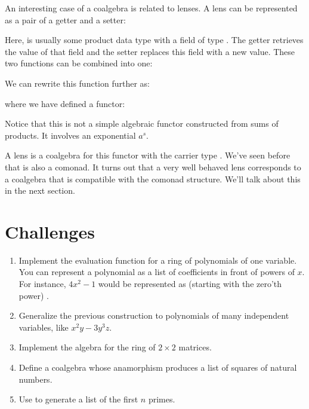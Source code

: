 An interesting case of a coalgebra is related to lenses. A lens can be
represented as a pair of a getter and a setter:

Here,  is usually some product data type with a field of type
. The getter retrieves the value of that field and the setter
replaces this field with a new value. These two functions can be
combined into one:

We can rewrite this function further as:

where we have defined a functor:

Notice that this is not a simple algebraic functor constructed from sums
of products. It involves an exponential $a^s$.

A lens is a coalgebra for this functor with the carrier type .
We've seen before that  is also a comonad. It turns out
that a very well behaved lens corresponds to a coalgebra that is compatible
with the comonad structure. We'll talk about this in the next section.

\section{Challenges}

\begin{enumerate}
	\tightlist
	\item
	      Implement the evaluation function for a ring of polynomials of one
	      variable. You can represent a polynomial as a list of coefficients in
	      front of powers of $x$. For instance, $4x^2-1$ would be
	      represented as (starting with the zero'th power)
	      \code{{[}-1, 0, 4{]}}.
	\item
	      Generalize the previous construction to polynomials of many
	      independent variables, like $x^2y-3y^3z$.
	\item
	      Implement the algebra for the ring of $2\times{}2$ matrices.
	\item
	      Define a coalgebra whose anamorphism produces a list of squares of
	      natural numbers.
	\item
	      Use  to generate a list of the first $n$ primes.
\end{enumerate}
